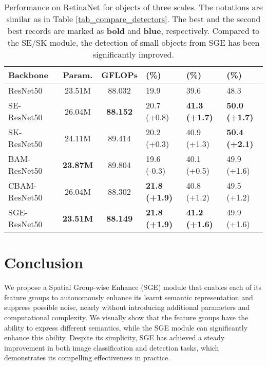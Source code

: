 \documentclass{article}
\begin{document}
\begin{table}
\small
		\centering
		\renewcommand\arraystretch{1.2}
		\newcommand{\tabincell}[2]{\begin{tabular}{@{}#1@{}}#2\end{tabular}}
\caption{Performance on RetinaNet for objects of three scales. The notations are similar as in Table \ref{tab_compare_detectors}. The best and the second best records are marked as {\bf bold} and {\bf\color{blue}blue}, respectively. Compared to the SE/SK module, the detection of small objects from SGE has been significantly improved.}
		\begin{tabular}{l|c|c|l|l|l}
			\hline
			Backbone & Param. & GFLOPs&  (\%) &  (\%) &  (\%)\\
			\hline
			ResNet50 \cite{he2016deep} & 23.51M & 88.032 &19.9&39.6&48.3\\ \hline
			SE-ResNet50 \cite{hu2018squeeze} &  26.04M & {\bf\color{blue}88.152} &20.7 {\scriptsize(+0.8)}&\bf {41.3 {\scriptsize(+1.7)}}&{\bf\color{blue} 50.0 {\scriptsize(+1.7)}}\\ SK-ResNet50 \cite{li2019selective} & 24.11M & 89.414 & 20.2 {\scriptsize(+0.3)}&40.9 {\scriptsize(+1.3)}&\bf {50.4 {\scriptsize(+2.1)}}\\
			BAM-ResNet50 \cite{park2018bam} & {\bf\color{blue} 23.87M} & 89.804 & 19.6 {\scriptsize(-0.3)} & 40.1 {\scriptsize(+0.5)} & 49.9 {\scriptsize(+1.6)}\\
			CBAM-ResNet50 \cite{woo2018cbam} & 26.04M & 88.302 &\bf {21.8 {\scriptsize(+1.9)}} & 40.8 {\scriptsize(+1.2)} & 49.5 {\scriptsize(+1.2)} \\ SGE-ResNet50 &\bf 23.51M &\bf 88.149 &\bf {21.8 {\scriptsize(+1.9)}}& {\bf\color{blue}41.2 {\scriptsize(+1.6)}}&{49.9 {\scriptsize(+1.6)}}\\ \hline
		\end{tabular}
		\label{tab_compare_DWC}
		\vspace{-12pt}
	\end{table}
	
	
	\section{Conclusion}
	We propose a Spatial Group-wise Enhance (SGE) module that enables each of its feature groups to autonomously enhance its learnt semantic representation and suppress possible noise, nearly without introducing additional parameters and computational complexity. We visually show that the feature groups have the ability to express different semantics, while the SGE module can significantly enhance this ability. Despite its simplicity, SGE has achieved a steady improvement in both image classification and detection tasks, which demonstrates its compelling effectiveness in practice.
	
	
	
	\small
	
	
	
	
	
\end{document}
